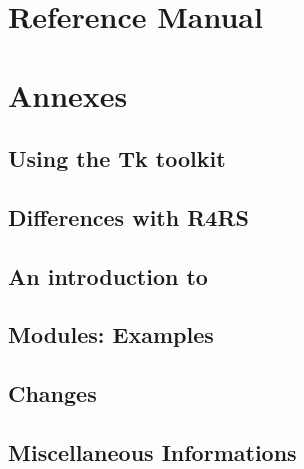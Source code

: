 \documentclass[10pt,a4paper]{book}
\begin{document}
\chead{}
\lfoot{}
\cfoot{\fancyplain{\bf\thepage}{}}
\rfoot{}


%
%
\tableofcontents



%
%
\part{Reference Manual}
\pagestyle{fancy}
\thispagestyle{plain}




%
%
\part{Annexes}
\appendix


\chapter{Using the Tk toolkit}


\chapter{Differences with R4RS}


\chapter{An introduction to {\stklos}}


\chapter{Modules: Examples}


\chapter{Changes}


\chapter{Miscellaneous Informations}




\begin{theindex}
\bigskip

\end{theindex}
\end{document}
